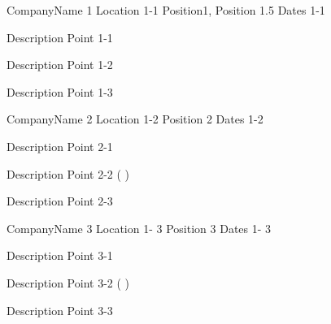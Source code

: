 

\begin{cventries}

  \cventry
    {CompanyName 1}
    {Location 1-1}
    {Position1, Position 1.5}
    {Dates 1-1}
    {
      \begin{cvitems}
        \item{Description Point 1-1}
        \item{Description Point 1-2}
        \item{Description Point 1-3}
      \end{cvitems}
    }

  \cventry
    {CompanyName 2}
    {Location 1-2}
    {Position 2}
    {Dates 1-2}
    {
      \begin{cvitems}
        \item{Description Point 2-1}
        \item{Description Point 2-2 (  )}
        \item{Description Point 2-3}
      \end{cvitems}
    }

  \cventry
    {CompanyName 3}
    {Location 1- 3}
    {Position 3}
    {Dates 1- 3}
    {
      \begin{cvitems}
        \item{Description Point 3-1}
        \item{Description Point 3-2 (  )}
        \item{Description Point 3-3}
      \end{cvitems}
    }

\end{cventries}


